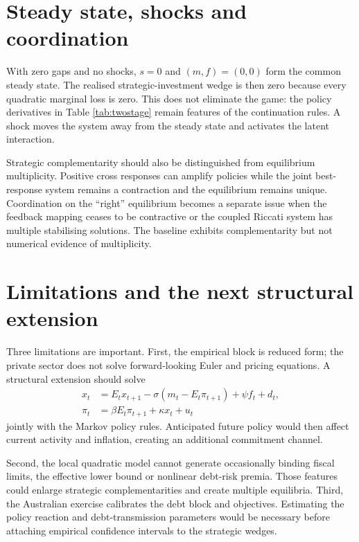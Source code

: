 \documentclass[11pt]{article}
\begin{document}
\section{Steady state, shocks and coordination}

With zero gaps and no shocks, $s=0$ and $(m,f)=(0,0)$ form the common steady
state.  The realised strategic-investment wedge is then zero because every
quadratic marginal loss is zero.  This does not eliminate the game: the policy
derivatives in Table \ref{tab:twostage} remain features of the continuation
rules.  A shock moves the system away from the steady state and activates the
latent interaction.

Strategic complementarity should also be distinguished from equilibrium
multiplicity.  Positive cross responses can amplify policies while the joint
best-response system remains a contraction and the equilibrium remains unique.
Coordination on the ``right'' equilibrium becomes a separate issue when the
feedback mapping ceases to be contractive or the coupled Riccati system has
multiple stabilising solutions.  The baseline exhibits complementarity but
not numerical evidence of multiplicity.

\section{Limitations and the next structural extension}

Three limitations are important.  First, the empirical block is reduced form;
the private sector does not solve forward-looking Euler and pricing equations.
A structural extension should solve
\begin{align*}
 x_t&=E_tx_{t+1}-\sigma(m_t-E_t\pi_{t+1})+\psi f_t+d_t,\\
 \pi_t&=\beta E_t\pi_{t+1}+\kappa x_t+u_t
\end{align*}
jointly with the Markov policy rules.  Anticipated future policy would then
affect current activity and inflation, creating an additional commitment
channel.

Second, the local quadratic model cannot generate occasionally binding fiscal
limits, the effective lower bound or nonlinear debt-risk premia.  Those
features could enlarge strategic complementarities and create multiple
equilibria.  Third, the Australian exercise calibrates the debt block and
objectives.  Estimating the policy reaction and debt-transmission parameters
would be necessary before attaching empirical confidence intervals to the
strategic wedges.
\end{document}
